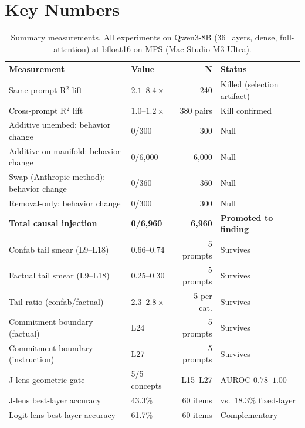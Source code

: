 \documentclass[11pt,a4paper]{article}
\begin{document}
\appendix

\section{Key Numbers}
\label{app:numbers}

\begin{table}[ht]
\centering
\small
\caption{Summary measurements. All experiments on Qwen3-8B (36~layers,
dense, full-attention) at bfloat16 on MPS (Mac Studio M3 Ultra).}
\label{tab:numbers}
\begin{tabular}{llrl}
\toprule
\textbf{Measurement} & \textbf{Value} & \textbf{N} & \textbf{Status} \\
\midrule
Same-prompt R$^2$ lift & $2.1$--$8.4\times$ & 240 & Killed (selection artifact) \\
Cross-prompt R$^2$ lift & $1.0$--$1.2\times$ & 380 pairs & Kill confirmed \\
Additive unembed: behavior change & 0/300 & 300 & Null \\
Additive on-manifold: behavior change & 0/6{,}000 & 6{,}000 & Null \\
Swap (Anthropic method): behavior change & 0/360 & 360 & Null \\
Removal-only: behavior change & 0/300 & 300 & Null \\
\textbf{Total causal injection} & \textbf{0/6{,}960} & \textbf{6{,}960} & \textbf{Promoted to finding} \\
\addlinespace
Confab tail smear (L9--L18) & $0.66$--$0.74$ & 5 prompts & Survives \\
Factual tail smear (L9--L18) & $0.25$--$0.30$ & 5 prompts & Survives \\
Tail ratio (confab/factual) & $2.3$--$2.8\times$ & 5 per cat. & Survives \\
Commitment boundary (factual) & L24 & 5 prompts & Survives \\
Commitment boundary (instruction) & L27 & 5 prompts & Survives \\
\addlinespace
J-lens geometric gate & 5/5 concepts & L15--L27 & AUROC $0.78$--$1.00$ \\
J-lens best-layer accuracy & 43.3\% & 60 items & vs.\ 18.3\% fixed-layer \\
Logit-lens best-layer accuracy & 61.7\% & 60 items & Complementary \\
\bottomrule
\end{tabular}
\end{table}
\end{document}
